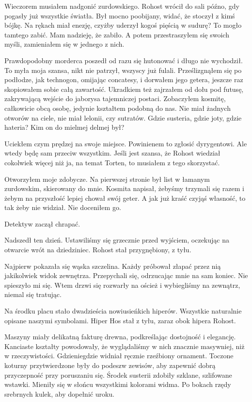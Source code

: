 Wieczorem musiałem nadgonić zurdowskiego.
Rohost wrócił do sali późno, gdy pogasły już wszystkie światła.
Był mocno poobijany, widać, że stoczył z kimś bójkę. 
Na rękach miał enezję, czyżby uderzył kogoś pięścią w sudurę? 
To mogło tamtego zabić. Mam nadzieję, że zabiło.
A potem przestraszyłem się swoich myśli, zamieniałem się w jednego z nich.

Prawdopodobny morderca poszedł od razu się hutonować i długo nie wychodził.
To myła moja szansa, nikt nie patrzył, wszyscy już fulali.
Prześlizgnąłem się po podłodze, jak technogon, omijając concatesy, i dorwałem jego getera, jeszcze raz skopiowałem sobie całą zawartość.
Ukradkiem też zajrzałem od dołu pod futusę, zakrywającą wejście do jaborysa tajemniczej postaci.
Zobaczyłem kosmitę, całkowicie obcą osobę, jedynie kształtem podobną do nas.
Nie miał żadnych otworów na ciele, nie miał lelonii, czy sutratów.
Gdzie susteria, gdzie joty, gdzie hateria?
Kim on do mielmej delmej był?

Uciekłem czym prędzej na swoje miejsce.
Powinienem to zgłosić dyrygentowi.
Ale wtedy będę sam przeciw wszystkim.
Jeśli jest szansa, że Rohost wiedział cokolwiek więcej niż ja, na temat Torten, to musiałem z tego skorzystać.

Otworzyłem moje zdobycze. 
Na pierwszej stronie był list w łamanym zurdowskim, skierowany do mnie.
Kosmita napisał, żebyśmy trzymali się razem i żebym na przyszłość lepiej chował swój geter.
A jak już kraść czyjąś własność, to tak żeby nie widział.
Nie doceniłem go.

\divider{}

Detektyw zaczął chrapać.

\divider{}

Nadszedł ten dzień.
Ustawiliśmy się grzecznie przed wyjściem, oczekując na otwarcie wrót na dziedziniec.
Rohost stał przygnębiony, z tyłu.

Najpierw pokazała się wąska szczelina.
Każdy próbował złapać przez nią jakikolwiek widok zewnętrza.
Przepychali się, odrzucając mnie na sam koniec. Nie spieszyło mi się.
Wtem drzwi się rozwarły na oścież i wybiegliśmy na zewnątrz, niemal się tratując.

Na środku placu stało dwadzieścia nowiusieńkich hiperów.
Wszystkie naturalnie opisane naszymi symbolami.
Hiper Hos stał z tyłu, zaraz obok hipera Rohost.

Maszyny miały delikatną fakturę drewna, podkreślając dostojność i elegancję.
Kanciaste kształty powodowały, że wyglądaliśmy w nich znacznie masywniej, niż w rzeczywistości.
Gdzieniegdzie widniał ręcznie rzeźbiony ornament.
Toczone koturny przytwierdzone były do podeszw zewisów, aby zapewnić dobrą przyczepność przy poruszaniu się.
Środek susterii zdobiły szklane, szlifowane wstawki. Mieniły się w słońcu wszystkimi kolorami widma.
Po bokach rzędy srebrnych kulek, aby dopełnić uroku.

